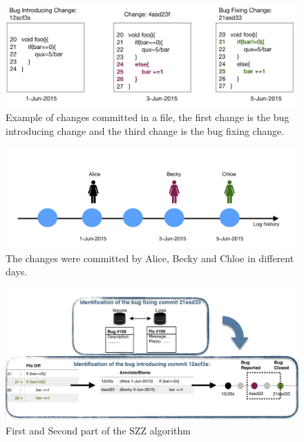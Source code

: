 \documentclass[a4paper, 12pt]{book}
\begin{document}
\begin{figure}
\centering
\includegraphics[width=\columnwidth]{img/code.png}
\caption{Example of changes committed in a file, the first change is the bug introducing change and the third change is the bug fixing change. }
\label{fig:code}       %
\end{figure}

\begin{figure}
\centering
\includegraphics[width=\columnwidth]{img/history-log.png}
\caption{The changes were committed by Alice, Becky and Chloe in different days. }
\label{fig:history-log}       %
\end{figure}

\begin{figure}
\centering
\includegraphics[width=\columnwidth]{img/SZZalgorithm.png}
\caption{First and Second part of the SZZ algorithm}
\label{fig:SZZalgorithm}       %
\end{figure}
\end{document}
